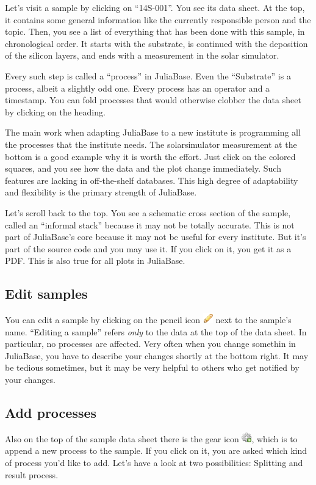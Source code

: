 \documentclass[a4paper,11pt,english]{sphinxmanual}
\begin{document}
Let's visit a sample by clicking on “14S-001”.  You see its data sheet.  At the
top, it contains some general information like the currently responsible person
and the topic.  Then, you see a list of everything that has been done with this
sample, in chronological order.  It starts with the substrate, is continued
with the deposition of the silicon layers, and ends with a measurement in the
solar simulator.

Every such step is called a “process” in JuliaBase.  Even the “Substrate” is a
process, albeit a slightly odd one.  Every process has an operator and a
timestamp.  You can fold processes that would otherwise clobber the data sheet
by clicking on the heading.

The main work when adapting JuliaBase to a new institute is programming all the
processes that the institute needs.  The solarsimulator measurement at the
bottom is a good example why it is worth the effort.  Just click on the colored
squares, and you see how the data and the plot change immediately.  Such
features are lacking in off-the-shelf databases.  This high degree of
adaptability and flexibility is the primary strength of JuliaBase.

Let's scroll back to the top.  You see a schematic cross section of the sample,
called an “informal stack” because it may not be totally accurate.  This is not
part of JuliaBase's core because it may not be useful for every institute.  But
it's part of the source code and you may use it.  If you click on it, you get
it as a PDF.  This is also true for all plots in JuliaBase.


\subsection{Edit samples}
\label{demo:edit-samples}
You can edit a sample by clicking on the pencil icon \includegraphics{pencil.png} next to the
sample's name.  “Editing a sample” refers \emph{only} to the data at the top of the
data sheet.  In particular, no processes are affected.  Very often when you
change somethin in JuliaBase, you have to describe your changes shortly at the
bottom right.  It may be tedious sometimes, but it may be very helpful to
others who get notified by your changes.


\subsection{Add processes}
\label{demo:add-processes}
Also on the top of the sample data sheet there is the gear icon \includegraphics{cog_add.png}, which is to append a new process to the sample.  If you click on it, you
are asked which kind of process you'd like to add.  Let's have a look at two
possibilities: Splitting and result process.
\end{document}
